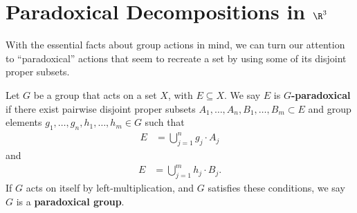 \section{Paradoxical Decompositions in $\R^3$}%
With the essential facts about group actions in mind, we can turn our attention to ``paradoxical'' actions that seem to recreate a set by using some of its disjoint proper subsets.
\begin{definition}
  Let $G$ be a group that acts on a set $X$, with $E\subseteq X$. We say $E$ is $G$\textbf{-paradoxical} if there exist pairwise disjoint proper subsets $A_1,\dots,A_n,B_1,\dots,B_m \subset E$ and group elements $g_1,\dots,g_n,h_1,\dots,h_m\in G$ such that
  \begin{align*}
    E &= \bigcup_{j=1}^{n}g_j\cdot A_j
  \end{align*}
  and
  \begin{align*}
    E &= \bigcup_{j=1}^{m}h_j\cdot B_j.
  \end{align*}
  If $G$ acts on itself by left-multiplication, and $G$ satisfies these conditions, we say $G$ is a \textbf{paradoxical group}.
\end{definition}
